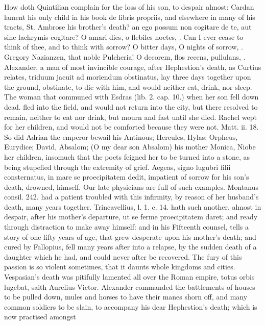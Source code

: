 {How doth Quintilian complain for the loss of his son, to despair
almost: Cardan lament his only child in his book de libris propriis,
and elsewhere in many of his tracts, St. Ambrose his brother's
death? an ego possum non cogitare de te, aut sine lachrymis cogitare? O
amari dies, o flebiles noctes, \etc{}. Can I ever cease to think of thee,
and to think with sorrow? O bitter days, O nights of sorrow, \etc{}.
Gregory Nazianzen, that noble Pulcheria! O decorem, \etc{} flos recens,
pullulans, \etc{}. Alexander, a man of most invincible courage, after
Hephestion's death, as Curtius relates, triduum jacuit ad moriendum
obstinatus, lay three days together upon the ground, obstinate, to die
with him, and would neither eat, drink, nor sleep. The woman that
communed with Esdras (lib. 2. cap. 10.) when her son fell down dead.
fled into the field, and would not return into the city, but there
resolved to remain, neither to eat nor drink, but mourn and fast until
she died. Rachel wept for her children, and would not be comforted
because they were not. Matt. ii. 18. So did Adrian the emperor bewail
his Antinous; Hercules, Hylas; Orpheus, Eurydice; David, Absalom; (O my
dear son Absalom) \Austin{} his mother Monica, Niobe her children,
insomuch that the poets feigned her to be turned into a stone, as
being stupefied through the extremity of grief. Aegeas, signo
lugubri filii consternatus, in mare se proecipitatem dedit, impatient
of sorrow for his son's death, drowned, himself. Our late physicians
are full of such examples. Montanus consil. 242. had a patient
troubled with this infirmity, by reason of her husband's death, many
years together. Trincavellius, l. 1. c. 14. hath such another, almost
in despair, after his mother's departure, ut se ferme
proecipitatem daret; and ready through distraction to make away
himself: and in his Fifteenth counsel, tells a story of one fifty years
of age, that grew desperate upon his mother's death; and cured by
Fallopius, fell many years after into a relapse, by the sudden death of
a daughter which he had, and could never after be recovered. The fury
of this passion is so violent sometimes, that it daunts whole kingdoms
and cities. Vespasian's death was pitifully lamented all over the Roman
empire, totus orbis lugebat, saith Aurelius Victor. Alexander commanded
the battlements of houses to be pulled down, mules and horses to have
their manes shorn off, and many common soldiers to be slain, to
accompany his dear Hephestion's death; which is now practised amongst
}
